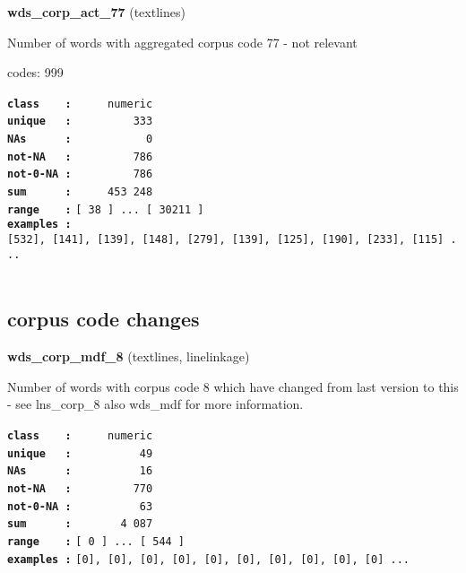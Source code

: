 \documentclass[]{article}
\begin{document}
\textbf{wds\_corp\_act\_77} (textlines)

Number of words with aggregated corpus code 77 - not relevant

codes: 999

\textbf{\texttt{class\ \ \ \ :}} \texttt{~~~~~numeric}\\
\textbf{\texttt{unique\ \ \ :}} \texttt{~~~~~~~~~333}\\
\textbf{\texttt{NAs\ \ \ \ \ \ :}} \texttt{~~~~~~~~~~~0}\\
\textbf{\texttt{not-NA\ \ \ :}} \texttt{~~~~~~~~~786}\\
\textbf{\texttt{not-0-NA\ :}} \texttt{~~~~~~~~~786}\\
\textbf{\texttt{sum\ \ \ \ \ \ :}} \texttt{~~~~~453~248}\\
\textbf{\texttt{range\ \ \ \ :}}
\texttt{{[}\ 38\ {]}\ ...\ {[}\ 30211\ {]}}\\
\textbf{\texttt{examples\ :}}
\texttt{{[}532{]},\ {[}141{]},\ {[}139{]},\ {[}148{]},\ {[}279{]},\ {[}139{]},\ {[}125{]},\ {[}190{]},\ {[}233{]},\ {[}115{]}\ ...}\\

~

\subsection{corpus code changes}\label{corpus-code-changes}

\textbf{wds\_corp\_mdf\_8} (textlines, linelinkage)

Number of words with corpus code 8 which have changed from last version
to this - see lns\_corp\_8 also wds\_mdf for more information.

\textbf{\texttt{class\ \ \ \ :}} \texttt{~~~~~numeric}\\
\textbf{\texttt{unique\ \ \ :}} \texttt{~~~~~~~~~~49}\\
\textbf{\texttt{NAs\ \ \ \ \ \ :}} \texttt{~~~~~~~~~~16}\\
\textbf{\texttt{not-NA\ \ \ :}} \texttt{~~~~~~~~~770}\\
\textbf{\texttt{not-0-NA\ :}} \texttt{~~~~~~~~~~63}\\
\textbf{\texttt{sum\ \ \ \ \ \ :}} \texttt{~~~~~~~4~087}\\
\textbf{\texttt{range\ \ \ \ :}}
\texttt{{[}\ 0\ {]}\ ...\ {[}\ 544\ {]}}\\
\textbf{\texttt{examples\ :}}
\texttt{{[}0{]},\ {[}0{]},\ {[}0{]},\ {[}0{]},\ {[}0{]},\ {[}0{]},\ {[}0{]},\ {[}0{]},\ {[}0{]},\ {[}0{]}\ ...}\\
\end{document}
